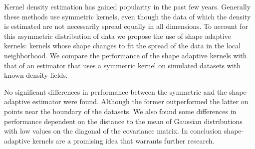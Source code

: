 \noindent Kernel density estimation has gained popularity in the past few years. 
Generally these methods use symmetric kernels, even though the data of which the density is estimated are not necessarily spread equally in all dimensions. To account for this asymmetric distribution of data we propose the use of shape adaptive kernels: kernels whose shape changes to fit the spread of the data in the local neighborhood.
We compare the performance of the shape adaptive kernels with that of an estimator that uses a symmetric kernel on simulated datasets with known density fields.

No significant differences in performance between the symmetric and the shape-adaptive estimator were found. Although the former outperformed the latter on points near the boundary of the datasets. We also found some differences in performance dependent on the distance to the mean of Gaussian distributions with low values on the diagonal of the covariance matrix.  
In conclusion shape-adaptive kernels are a promising idea that warrants further research.
